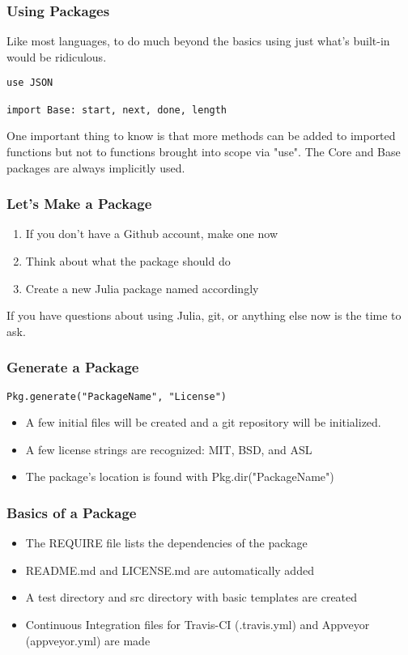 \documentclass{beamer}
\begin{document}
\begin{frame}[fragile]
\frametitle{Using Packages}

Like most languages, to do much beyond the basics using just what's built-in
would be ridiculous.

\begin{verbatim}
use JSON

import Base: start, next, done, length

\end{verbatim}

One important thing to know is that more methods can be added to imported
functions but not to functions brought into scope via "use". The Core and
Base packages are always implicitly used.

\end{frame}

\begin{frame}
\frametitle{Let's Make a Package}

\begin{enumerate}
  \item If you don't have a Github account, make one now
  \item Think about what the package should do
  \item Create a new Julia package named accordingly
\end{enumerate}

If you have questions about using Julia, git, or anything else now is the time 
to ask.
\end{frame}

\begin{frame}[fragile]
\frametitle{Generate a Package}

\begin{verbatim}
Pkg.generate("PackageName", "License")
\end{verbatim}

\begin{itemize}
  \item A few initial files will be created and a git repository will be initialized.
  \item A few license strings are recognized: MIT, BSD, and ASL
  \item The package's location is found with Pkg.dir("PackageName")
\end{itemize}

\end{frame}

\begin{frame}
\frametitle{Basics of a Package}

\begin{itemize}
  \item The REQUIRE file lists the dependencies of the package
  \item README.md and LICENSE.md are automatically added
  \item A test directory and src directory with basic templates are created
  \item Continuous Integration files for Travis-CI (.travis.yml) and Appveyor (appveyor.yml) are made
\end{itemize}

\end{frame}
\end{document}
